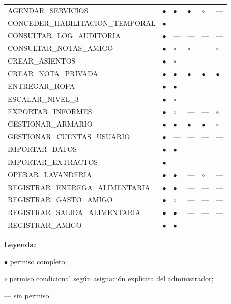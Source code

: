 \begin{longtable}[]{
    @{}p{}
    p{}
    p{}
    p{}
    p{}
    p{}@{}}
    AGENDAR\_SERVICIOS & $\bullet$ & $\bullet$ & $\bullet$ & $\circ$  & --- \\
    CONCEDER\_HABILITACION\_TEMPORAL & $\bullet$ & --- & --- & --- & --- \\
    CONSULTAR\_LOG\_AUDITORIA & $\bullet$ & --- & --- & --- & --- \\
    CONSULTAR\_NOTAS\_AMIGO & $\bullet$ & $\circ$  & $\circ$  & --- & $\circ$  \\
    CREAR\_ASIENTOS & $\bullet$ & $\circ$ & --- & --- & --- \\
    CREAR\_NOTA\_PRIVADA & $\bullet$ & $\bullet$  & $\bullet$  & $\bullet$ & $\bullet$  \\
    ENTREGAR\_ROPA & $\bullet$ & $\bullet$ & --- & --- & --- \\
    ESCALAR\_NIVEL\_3 & $\bullet$ & $\circ$  & --- & --- & --- \\
    EXPORTAR\_INFORMES & $\bullet$ & $\circ$  & --- & --- & $\circ$  \\
    GESTIONAR\_ARMARIO & $\bullet$ & $\bullet$ & $\bullet$ & $\bullet$ & $\circ$  \\
    GESTIONAR\_CUENTAS\_USUARIO & $\bullet$ & --- & --- & --- & --- \\
    IMPORTAR\_DATOS & $\bullet$ & $\bullet$ & --- & --- & --- \\
    IMPORTAR\_EXTRACTOS & $\bullet$ & --- & --- & --- & --- \\
    OPERAR\_LAVANDERIA & $\bullet$ & $\bullet$ & --- & $\circ$  & --- \\
    REGISTRAR\_ENTREGA\_ALIMENTARIA & $\bullet$ & $\bullet$ & --- & --- & --- \\
    REGISTRAR\_GASTO\_AMIGO & $\bullet$ & $\circ$  & --- & --- & --- \\
    REGISTRAR\_SALIDA\_ALIMENTARIA & $\bullet$ & $\bullet$ & --- & --- & --- \\
    REGISTRAR\_AMIGO & $\bullet$ & $\bullet$ & --- & --- & --- \\
\end{longtable}

\textbf{Leyenda:} 
\par
$\bullet$  permiso completo; 
\par
$\circ$  permiso condicional según
asignación explícita del administrador; 
\par
--- sin permiso.


